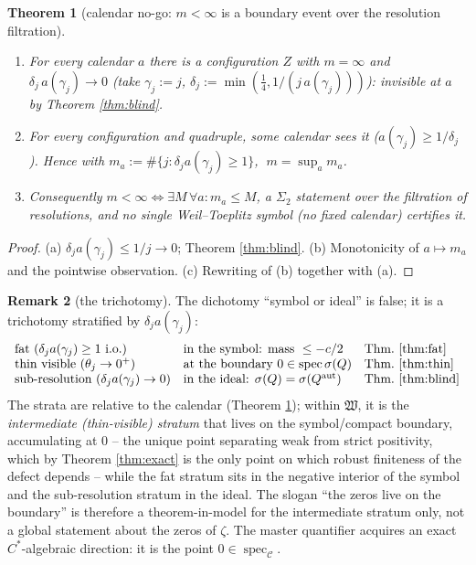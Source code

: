 \documentclass[11pt,reqno]{amsart}
\newtheorem{theorem}{Theorem}[section]
\theoremstyle{definition}
\newtheorem{remark}[theorem]{Remark}
\newcommand{\Cor}{\mathcal{C}}
\newcommand{\spec}{\operatorname{spec}}
\newcommand{\Qaut}{Q^{\mathrm{aut}}}
\begin{document}
\begin{theorem}[calendar no-go: \(m<\infty\) is a boundary event over the
resolution filtration]\label{thm:nogo}
\begin{enumerate}
\item[\textup{(a)}] For \emph{every} calendar \(a\) there is a configuration
\(Z\) with \(m=\infty\) and \(\delta_j\,a(\gamma_j)\to0\) (take
\(\gamma_j:=j\), \(\delta_j:=\min(\tfrac14,1/(j\,a(\gamma_j)))\)): invisible at
\(a\) by Theorem \ref{thm:blind}.
\item[\textup{(b)}] For every configuration and quadruple, some calendar sees it
(\(a(\gamma_j)\geq1/\delta_j\)). Hence with
\(m_a:=\#\{j:\delta_j a(\gamma_j)\geq1\}\), \(\;m=\sup_a m_a\).
\item[\textup{(c)}] Consequently \(m<\infty\iff\exists M\,\forall a:m_a\leq M\),
a \(\Sigma_2\) statement over the filtration of resolutions, and \emph{no single
Weil--Toeplitz symbol (no fixed calendar) certifies it}.
\end{enumerate}
\end{theorem}

\begin{proof}
(a) \(\delta_j a(\gamma_j)\leq1/j\to0\); Theorem \ref{thm:blind}. (b)
Monotonicity of \(a\mapsto m_a\) and the pointwise observation. (c) Rewriting of
(b) together with (a).
\end{proof}

\begin{remark}[the trichotomy]\label{rem:trichotomy}
The dichotomy ``symbol or ideal'' is false; it is a trichotomy stratified by
\(\delta_j a(\gamma_j)\):
\[
\begin{array}{lll}
\text{fat }(\delta_j a(\gamma_j)\geq1\text{ i.o.}) &
\text{in the symbol: mass }\leq-c/2 & \text{Thm.\ \ref{thm:fat}}\\
\text{thin visible }(\theta_j\to0^+) &
\text{at the boundary }0\in\spec\sigma(Q) & \text{Thm.\ \ref{thm:thin}}\\
\text{sub-resolution }(\delta_j a(\gamma_j)\to0) &
\text{in the ideal: }\sigma(Q)=\sigma(\Qaut) & \text{Thm.\ \ref{thm:blind}}
\end{array}
\]
The strata are relative to the calendar (Theorem \ref{thm:nogo}); within
\(\mathfrak W\), it is the \emph{intermediate (thin-visible) stratum} that lives
on the symbol/compact boundary, accumulating at \(0\) -- the unique point
separating weak from strict positivity, which by Theorem \ref{thm:exact} is the
only point on which robust finiteness of the defect depends -- while the fat
stratum sits in the negative interior of the symbol and the sub-resolution
stratum in the ideal. The slogan ``the zeros live on the boundary'' is therefore
a theorem-in-model for the intermediate stratum only, not a global statement
about the zeros of \(\zeta\). The master quantifier acquires an
exact \(C^*\)-algebraic direction: it is the point \(0\in\spec_{\Cor}\).
\end{remark}
\end{document}
